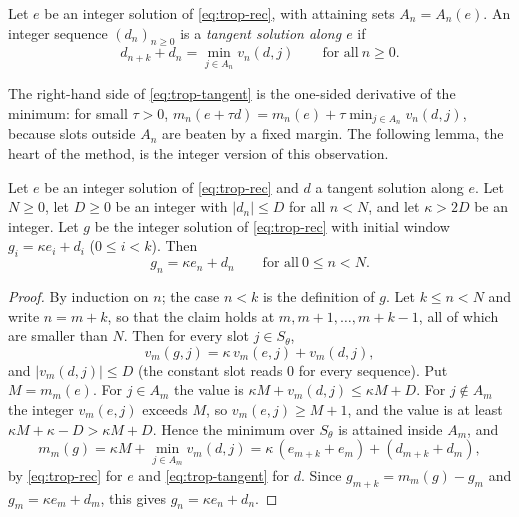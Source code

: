 \begin{definition}
\label{def:trop-tangent}
Let $e$ be an integer solution of \eqref{eq:trop-rec}, with attaining sets
$A_n=A_n(e)$. An integer sequence $(d_n)_{n\ge0}$ is a \textit{tangent solution
along $e$} if
\begin{equation}
d_{n+k}+d_n=\min_{j\in A_n}v_n(d,j)\qquad\text{for all}\ n\ge0.
\label{eq:trop-tangent}
\end{equation}
\end{definition}

The right-hand side of \eqref{eq:trop-tangent} is the one-sided derivative of the
minimum: for small $\tau>0$, $m_n(e+\tau d)=m_n(e)+\tau\min_{j\in A_n}v_n(d,j)$,
because slots outside $A_n$ are beaten by a fixed margin. The following lemma, the
heart of the method, is the integer version of this observation.

\begin{lemma}
\label{lem:trop-pinning}
Let $e$ be an integer solution of \eqref{eq:trop-rec} and $d$ a tangent solution
along $e$. Let $N\ge0$, let $D\ge0$ be an integer with $|d_n|\le D$ for all $n<N$,
and let $\kappa>2D$ be an integer. Let $g$ be the integer solution of
\eqref{eq:trop-rec} with initial window $g_i=\kappa e_i+d_i$ ($0\le i<k$). Then
\[
g_n=\kappa e_n+d_n\qquad\text{for all}\ 0\le n<N.
\]
\end{lemma}

\begin{proof}
By induction on $n$; the case $n<k$ is the definition of $g$. Let $k\le n<N$ and
write $n=m+k$, so that the claim holds at $m,m+1,\dots,m+k-1$, all of which are
smaller than $N$. Then for every slot $j\in S_\theta$,
\[
v_m(g,j)=\kappa\,v_m(e,j)+v_m(d,j),
\]
and $|v_m(d,j)|\le D$ (the constant slot reads $0$ for every sequence). Put
$M=m_m(e)$. For $j\in A_m$ the value is $\kappa M+v_m(d,j)\le\kappa M+D$. For
$j\notin A_m$ the integer $v_m(e,j)$ exceeds $M$, so $v_m(e,j)\ge M+1$, and the
value is at least $\kappa M+\kappa-D>\kappa M+D$. Hence the minimum over $S_\theta$ is
attained inside $A_m$, and
\[
m_m(g)=\kappa M+\min_{j\in A_m}v_m(d,j)=\kappa\,(e_{m+k}+e_m)+(d_{m+k}+d_m),
\]
by \eqref{eq:trop-rec} for $e$ and \eqref{eq:trop-tangent} for $d$. Since
$g_{m+k}=m_m(g)-g_m$ and $g_m=\kappa e_m+d_m$, this gives $g_n=\kappa e_n+d_n$.
\end{proof}

